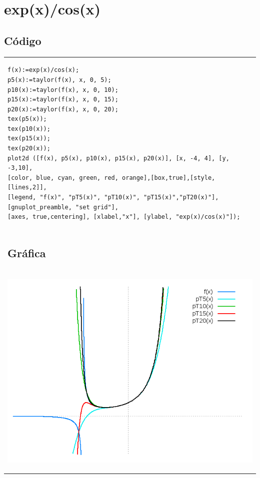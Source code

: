 \documentclass[10pt]{article}
\begin{document}
\section{exp(x)/cos(x)}


\subsection{Código}
\begin{tabular}{l}
\begin{verbatim}  
f(x):=exp(x)/cos(x);
p5(x):=taylor(f(x), x, 0, 5);
p10(x):=taylor(f(x), x, 0, 10);
p15(x):=taylor(f(x), x, 0, 15);
p20(x):=taylor(f(x), x, 0, 20);
tex(p5(x));
tex(p10(x));
tex(p15(x));
tex(p20(x));
plot2d ([f(x), p5(x), p10(x), p15(x), p20(x)], [x, -4, 4], [y, -3,10],
[color, blue, cyan, green, red, orange],[box,true],[style,[lines,2]],
[legend, "f(x)", "pT5(x)", "pT10(x)", "pT15(x)","pT20(x)"],
[gnuplot_preamble, "set grid"],
[axes, true,centering], [xlabel,"x"], [ylabel, "exp(x)/cos(x)"]);

\end{verbatim} \\
\subsection{Gráfica}\\
\begin{center}
  
    \includegraphics[scale=0.4]{expcos}
\end{center}
\end{tabular}
\end{document}

